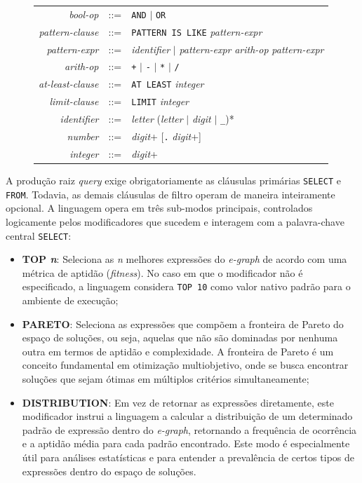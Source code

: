 \begin{figure}[htbp]
\begin{tabular}{rcl}
        \textit{bool-op} & ::= & \texttt{AND} $\mid$ \texttt{OR} \\[4pt]
        \textit{pattern-clause} & ::= & \texttt{PATTERN IS LIKE} \textit{pattern-expr} \\[4pt]
        \textit{pattern-expr} & ::= & \textit{identifier}
            $\mid$ \textit{pattern-expr} \textit{arith-op} \textit{pattern-expr} \\[4pt]
        \textit{arith-op} & ::= & \texttt{+} $\mid$ \texttt{-}
            $\mid$ \texttt{*} $\mid$ \texttt{/} \\[4pt]
        \textit{at-least-clause} & ::= & \texttt{AT LEAST} \textit{integer} \\[4pt]
        \textit{limit-clause} & ::= & \texttt{LIMIT} \textit{integer} \\[4pt]
        \textit{identifier} & ::= & \textit{letter} (\textit{letter} $\mid$ \textit{digit}
            $\mid$ \texttt{\_})* \\[4pt]
        \textit{number} & ::= & \textit{digit}+ [\texttt{.} \textit{digit}+] \\[4pt]
        \textit{integer} & ::= & \textit{digit}+ \\
        \bottomrule
    \end{tabular}
    \label{fig:iql_grammar}
\end{figure}

A produção raiz \textit{query} exige obrigatoriamente as cláusulas primárias \texttt{SELECT} e \texttt{FROM}. Todavia, as demais cláusulas de filtro operam de maneira inteiramente opcional. A linguagem opera em três sub-modos principais, controlados logicamente pelos modificadores que sucedem e interagem com a palavra-chave central \texttt{SELECT}:

\begin{itemize}
    \item \textbf{TOP \textit{n}}: Seleciona as \textit{n} melhores expressões do \textit{e-graph} de acordo com uma métrica de aptidão (\textit{fitness}). No caso em que o modificador não é especificado, a linguagem considera \texttt{TOP 10} como valor nativo padrão para o ambiente de execução;
    \item \textbf{PARETO}: Seleciona as expressões que compõem a fronteira de Pareto do espaço de soluções, ou seja, aquelas que não são dominadas por nenhuma outra em termos de aptidão e complexidade. A fronteira de Pareto é um conceito fundamental em otimização multiobjetivo, onde se busca encontrar soluções que sejam ótimas em múltiplos critérios simultaneamente;
    \item \textbf{DISTRIBUTION}: Em vez de retornar as expressões diretamente, este modificador instrui a linguagem a calcular a distribuição de um determinado padrão de expressão dentro do \textit{e-graph}, retornando a frequência de ocorrência e a aptidão média para cada padrão encontrado. Este modo é especialmente útil para análises estatísticas e para entender a prevalência de certos tipos de expressões dentro do espaço de soluções.
\end{itemize}

